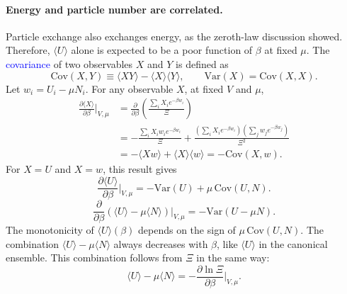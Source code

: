 \paragraph{Energy and particle number are correlated.}
Particle exchange also exchanges energy, as the zeroth-law discussion
showed. Therefore, $\langle U\rangle$ alone is expected to be a poor
function of $\beta$ at fixed $\mu$. The \textcolor{blue}{covariance} of two
observables $X$ and $Y$ is defined as
\begin{equation}
    \boxed{\mathrm{Cov}(X,Y)\equiv\langle XY\rangle-\langle X\rangle\langle Y\rangle,
    \qquad\mathrm{Var}(X)=\mathrm{Cov}(X,X).}
\end{equation}
Let $w_i=U_i-\mu N_i$. For any observable $X$, at fixed $V$ and $\mu$,
\begin{align*}
    \frac{\partial\langle X\rangle}{\partial\beta}\bigg|_{V,\mu}
    &=\frac{\partial}{\partial\beta}\left(\frac{\sum_i X_i e^{-\beta w_i}}{\Xi}\right)\\
    &=-\frac{\sum_i X_i w_i e^{-\beta w_i}}{\Xi}
    +\frac{\left(\sum_i X_i e^{-\beta w_i}\right)\left(\sum_j w_j e^{-\beta w_j}\right)}{\Xi^2}\\
    &=-\langle Xw\rangle+\langle X\rangle\langle w\rangle
    =-\mathrm{Cov}(X,w).
\end{align*}
For $X=U$ and $X=w$, this result gives
\begin{equation}
    \boxed{\frac{\partial\langle U\rangle}{\partial\beta}\bigg|_{V,\mu}
    =-\mathrm{Var}(U)+\mu\,\mathrm{Cov}(U,N).}
\end{equation}
\begin{equation}
    \boxed{\frac{\partial}{\partial\beta}\left(\langle U\rangle-\mu\langle N\rangle\right)\bigg|_{V,\mu}
    =-\mathrm{Var}(U-\mu N).}
\end{equation}
The monotonicity of $\langle U\rangle(\beta)$ depends on the sign of
$\mu\,\mathrm{Cov}(U,N)$. The combination $\langle U\rangle-\mu\langle N\rangle$
always decreases with $\beta$, like $\langle U\rangle$ in the canonical
ensemble. This combination follows from $\Xi$ in the same way:
\begin{equation}
    \boxed{\langle U\rangle-\mu\langle N\rangle
    =-\frac{\partial\ln\Xi}{\partial\beta}\bigg|_{V,\mu}.}
\end{equation}

